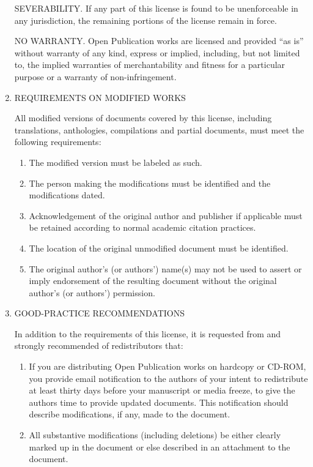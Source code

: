 \begin{enumerate}
SEVERABILITY. If any part of this license is found to be unenforceable
in any jurisdiction, the remaining portions of the license remain in
force.

NO WARRANTY. Open Publication works are licensed and provided ``as is'' without warranty of any kind, express or implied, including, but not
limited to, the implied warranties of merchantability and fitness for a
particular purpose or a warranty of non-infringement.

\item REQUIREMENTS ON MODIFIED WORKS

All modified versions of documents covered by this license, including
translations, anthologies, compilations and partial documents, must meet
the following requirements:

\begin{enumerate}
\item The modified version must be labeled as such.
\item The person making the modifications must be identified and the
   modifications dated.
\item Acknowledgement of the original author and publisher if applicable
   must be retained according to normal academic citation practices.
\item The location of the original unmodified document must be identified.
\item The original author's (or authors') name(s) may not be used to assert
   or imply endorsement of the resulting document without the original
   author's (or authors') permission.
\end{enumerate}


\item GOOD-PRACTICE RECOMMENDATIONS

In addition to the requirements of this license, it is requested from
and strongly recommended of redistributors that:

\begin{enumerate}
\item If you are distributing Open Publication works on hardcopy or CD-ROM,
   you provide email notification to the authors of your intent to
   redistribute at least thirty days before your manuscript or media
   freeze, to give the authors time to provide updated documents. This
   notification should describe modifications, if any, made to the
   document.

\item All substantive modifications (including deletions) be either clearly
   marked up in the document or else described in an attachment to the
   document. 
\end{enumerate}


\end{enumerate}
